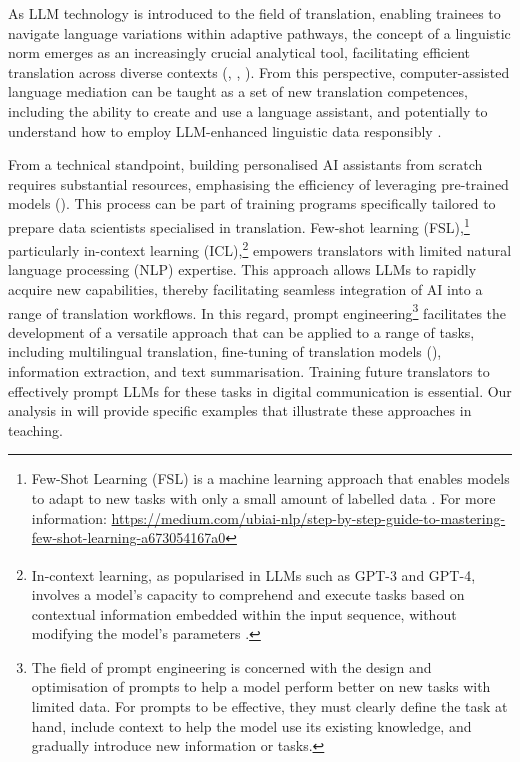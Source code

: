 \documentclass[output=paper]{langscibook}
\begin{document}
As LLM technology is introduced to the field of translation, enabling trainees to navigate language variations within adaptive pathways, the concept of a linguistic norm emerges as an increasingly crucial analytical tool, facilitating efficient translation across diverse contexts (\citealt{fabricius2022}, \citealt{schulz23}, \citealt{sinner20}). From this perspective, computer-assisted language mediation can be taught as a set of new translation competences, including the ability to create and use a language assistant, and potentially to understand how to employ LLM-enhanced linguistic data responsibly \citep{raza2025developingsaferesponsiblelarge}.

From a technical standpoint, building personalised AI assistants from scratch requires substantial resources, emphasising the efficiency of leveraging pre-trained models (\citealt{shichkina22}). This process can be part of training programs specifically tailored to prepare data scientists specialised in translation. Few-shot learning (FSL),\footnote{Few-Shot Learning (FSL) is a machine learning approach that enables models to adapt to new tasks with only a small amount of labelled data \citep{mosbach2023fewshotfinetuningvsincontext}. For more information: \url{https://medium.com/ubiai-nlp/step-by-step-guide-to-mastering-few-shot-learning-a673054167a0}} particularly in-context learning (ICL),\footnote{\textrm{\textsuperscript{} }\textrm{In-context learning, as popularised in LLMs such as GPT-3 and GPT-4, involves a model’s capacity to comprehend and execute tasks based on contextual information embedded within the input sequence, without modifying the model's parameters \citep{dong2024surveyincontextlearning}.}} empowers translators with limited natural language processing (NLP) expertise. This approach allows LLMs to rapidly acquire new capabilities, thereby facilitating seamless integration of AI into a range of translation workflows. In this regard, prompt engineering\footnote{\textrm{The field of prompt engineering is concerned with the design and optimisation of prompts to help a model perform better on new tasks with limited data. For prompts to be effective, they must clearly define the task at hand, include context to help the model use its existing knowledge, and gradually introduce new information or tasks.}} facilitates the development of a versatile approach that can be applied to a range of tasks, including multilingual translation, fine-tuning of translation models (\citealt{dogrumoorkens2024}), information extraction, and text summarisation. Training future translators to effectively prompt LLMs for these tasks in digital communication is essential. Our analysis in  will provide specific examples that illustrate these approaches in teaching.
\end{document}
